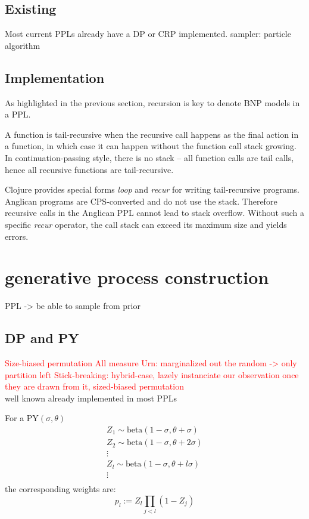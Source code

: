 \subsection{Existing}
Most current \glspl{PPL} already have a \gls{DP} or \gls{CRP} implemented.
sampler: particle algorithm

\subsection{Implementation}
As highlighted in the previous section, recursion is key to denote \gls{BNP} models in a \gls{PPL}.

A function is tail-recursive when the recursive call happens as the final action in a function, in which case it can happen without the function call stack growing. In continuation-passing style, there is no stack – all function calls are tail calls, hence all recursive functions are tail-recursive.

Clojure provides special forms \emph{loop} and \emph{recur} for writing tail-recursive programs. Anglican programs are \gls{CPS}-converted and do not use the stack. Therefore recursive calls in the Anglican \gls{PPL} cannot lead to stack overflow.
Without such a specific \emph{recur} operator, the call stack can exceed its maximum size and yields errors.


\section{generative process construction}
PPL -> be able to sample from prior

\subsection{DP and PY}
\textcolor{red}{Size-biased permutation
All measure
Urn: marginalized out the random -> only partition left
Stick-breaking: hybrid-case, lazely instanciate our observation once they are drawn from it, sized-biased permutation }\\

well known
already implemented in most \gls{PPL}s

For a $\text{PY}(\sigma, \theta)$
\begin{gather*}
Z_1 \sim \text{beta}(1-\sigma,\theta + \sigma) \\
Z_2 \sim \text{beta}(1-\sigma,\theta + 2\sigma) \\
\vdots \\
Z_l \sim \text{beta}(1-\sigma,\theta + l\sigma) \\
\vdots \\
\end{gather*}
the corresponding weights are:
$$ p_l := Z_l \prod_{j<l}{(1 - Z_j)} $$

